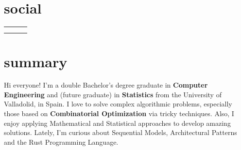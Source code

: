 \documentclass{friggeri-cv}
\newcommand{\myhref}[2]{\href[pdfnewwindow=true]{#1}{#2}}
\begin{document}


  \section{social}

    \vspace{-1.5em}
    \begin{center}
      \renewcommand{\arraystretch}{1.5}
      \begin{tabular}{ p{16em} p{17em} p{16em} }
        \myhref{https://garciparedes.me}{\faHome\quad Website: garciparedes.me}
        &
        \myhref{mailto:sergio@garciparedes.me}{\faEnvelope\quad Email: sergio@garciparedes.me}
        &
        \myhref{https://es.linkedin.com/in/garciparedes/en}{\faLinkedin\quad LinkedIn: Sergio García Prado}
        \\

        \myhref{https://github.com/garciparedes}{\faGithub\quad GitHub: @garciparedes}
        &
        \myhref{https://scholar.google.es/citations?user=X3Mb7BAAAAAJ}{\faGraduationCap\quad Scholar: Sergio García Prado}
        &
        \myhref{https://stackoverflow.com/users/3921457/garciparedes}{\faStackOverflow\quad StackOverflow: @garciparedes}
        \\
      \end{tabular}
    \end{center}




  \section{summary}

    Hi everyone! I'm a double Bachelor's degree graduate in \textbf{Computer Engineering} and (future graduate) in \textbf{Statistics} from the University of Valladolid, in Spain. I love to solve complex algorithmic problems, especially those based on \textbf{Combinatorial Optimization} via tricky techniques. Also, I enjoy applying Mathematical and Statistical approaches to develop amazing solutions. Lately, I'm curious about Sequential Models, Architectural Patterns and the Rust Programming Language. 
\end{document}
